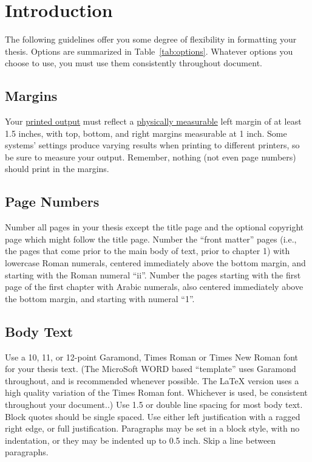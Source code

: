 \chapter{Introduction}
\label{cpt:intro}

The following guidelines offer you some degree of flexibility in formatting
your thesis. Options are summarized in Table~\ref{tab:options}.  Whatever
options you choose to use, you must use them consistently throughout document.

\section{Margins}

Your \underline{printed output} must reflect a \underline{physically
measurable} left margin of at least 1.5 inches, with top, bottom, and right
margins measurable at 1 inch.  Some systems' settings produce varying results
when printing to different printers, so be sure to measure your output.
Remember, nothing (not even page numbers) should print in the margins.

\section{Page Numbers}

Number all pages in your thesis except the title page and the optional
copyright page which might follow the title page.  Number the ``front matter''
pages (i.e., the pages that come prior to the main body of text, prior to
chapter 1) with lowercase Roman numerals, centered immediately above the bottom
margin, and starting with the Roman numeral ``ii''.  Number the pages starting
with the first page of the first chapter with Arabic numerals, also centered
immediately above the bottom margin, and starting with numeral ``1''.

\section{Body Text}

Use a 10, 11, or 12-point Garamond, Times Roman or Times New Roman font for
your thesis text.  {\scriptsize (The MicroSoft WORD based ``template'' uses
Garamond throughout, and is recommended whenever possible.  The \LaTeX{}
version uses a high quality variation of the Times Roman font.  Whichever is
used, be consistent throughout your document..)}  Use 1.5 or double line
spacing for most body text.  Block quotes should be single spaced.  Use either
left justification with a ragged right edge, or full justification.  Paragraphs
may be set in a block style, with no indentation, or they may be indented up to
0.5 inch.  Skip a line between paragraphs.

